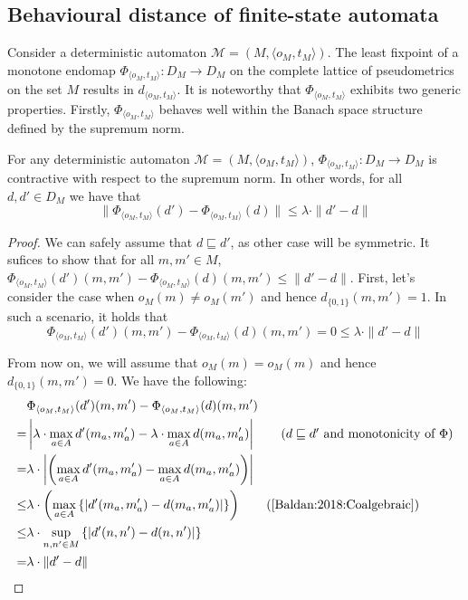 \subsection{Behavioural distance of finite-state automata}\label{c2:subsec:distance_finite_automata}
Consider a deterministic automaton $\mathcal{M} = (M, \langle o_M, t_M\rangle)$. The least fixpoint of a monotone endomap $\Phi_{\langle o_M, t_M\rangle} \colon D_{M} \to D_{M}$ on the complete lattice of pseudometrics on the set $M$ results in $d_{\langle o_M, t_M\rangle}$.
It is noteworthy that $\Phi_{\langle o_M, t_M\rangle}$ exhibits two generic properties. Firstly, $\Phi_{\langle o_M, t_M\rangle}$ behaves well within the Banach space structure defined by the supremum norm.
\begin{lemma}\label{c2:lem:operator_nonexpansive}
	For any deterministic automaton $\mathcal{M} = (M, \langle o_M, t_M\rangle)$,  $\Phi_{\langle o_M, t_M\rangle} \colon D_M \to D_M$ is contractive with respect to the supremum norm. In other words, for all $d, d' \in D_M$ we have that
    $$\|\Phi_{\langle o_M, t_M\rangle}(d') - \Phi_{\langle o_M, t_M\rangle}(d) \| \leq \lambda \cdot\|d' - d \|$$
\end{lemma}
\begin{proof}
    We can safely assume that $d \sqsubseteq d'$, as other case will be symmetric. It sufices to show that for all $m, m' \in M$, $\Phi_{\langle o_M, t_M\rangle}(d')(m,m') - \Phi_{\langle o_M, t_M\rangle}(d)(m,m') \leq \|d' - d \|$. First, let's consider the case when $o_M(m) \neq o_M(m')$ and hence $d_{\{0,1\}}(m,m')=1$. In such a scenario, it holds that $$\Phi_{\langle o_M, t_M\rangle}(d')(m,m') - \Phi_{\langle o_M, t_M\rangle}(d)(m,m') = 0 \leq \lambda \cdot \|d'-d \|$$ 
    
    From now on, we will assume that $o_M(m) = o_M(m)$ and hence $d_{\{0,1\}}(m,m')=0$. We have the following:
    \begin{align*}
        &\Phi_{\langle o_M, t_M\rangle}(d')(m,m') - \Phi_{\langle o_M, t_M\rangle}(d)(m,m')\\
        =& \left|\lambda \cdot \max_{a \in \alphabet} d'(m_a, m'_a) - \lambda \cdot \max_{a \in \alphabet} d(m_a, m'_a)\right| \tag{$d \sqsubseteq d'$ and monotonicity of $\Phi$} \\
        =& \lambda \cdot\left| \left( \max_{a \in \alphabet} d'(m_a, m'_a) - \max_{a \in \alphabet} d(m_a,  m'_a) \right) \right|\\
        \leq & \lambda \cdot \left(\max_{a \in \alphabet} \left\{\left|d'(m_a, m'_a) - d(m_a, m'_a) \right| \right\}\right) \tag{\cite[Lemma~3.4]{Baldan:2018:Coalgebraic}}\\  
        \leq & \lambda \cdot \sup_{n,n' \in M} \left\{ | d'(n,n') - d(n,n')|\right\} \\
        =& \lambda \cdot \|d' - d \| \tag*{\hfill\qedhere}
    \end{align*}
\end{proof}
